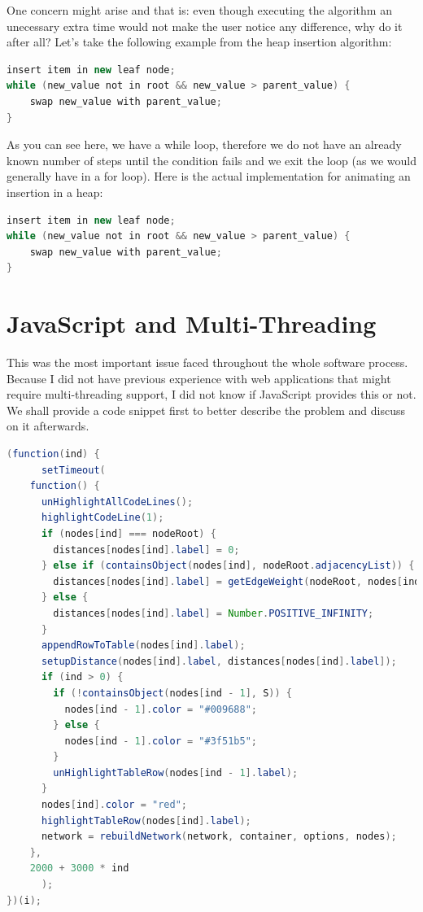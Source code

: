\documentclass{l4proj}
\begin{document}
One concern might arise and that is: even though executing the algorithm an unecessary extra time would not make the
user notice any difference, why do it after all? Let's take the following example from the heap insertion algorithm:

\begin{lstlisting}[language=Java, caption=Pseudocode for inserting a node in a heap.]
insert item in new leaf node; 
while (new_value not in root && new_value > parent_value) {
    swap new_value with parent_value;
}
\end{lstlisting}

As you can see here, we have a while loop, therefore we do not have an already known number of steps until the
condition fails and we exit the loop (as we would generally have in a for loop). Here is the actual implementation for
animating an insertion in a heap:

\begin{lstlisting}[language=Java, caption=Pseudocode for inserting a node in a heap.]
insert item in new leaf node; 
while (new_value not in root && new_value > parent_value) {
    swap new_value with parent_value;
}
\end{lstlisting}

\section{JavaScript and Multi-Threading}

This was the most important issue faced throughout the whole software process. Because I did not have previous
experience with web applications that might require multi-threading support, I did not know if JavaScript provides this
or not. We shall provide a code snippet first to better describe the problem and discuss on it afterwards.

\begin{lstlisting}[language=Java, caption=Animation function used in Dijkstra's SP algorithm.]
(function(ind) {
      setTimeout(
	function() {
	  unHighlightAllCodeLines();
	  highlightCodeLine(1);
	  if (nodes[ind] === nodeRoot) {
	    distances[nodes[ind].label] = 0;
	  } else if (containsObject(nodes[ind], nodeRoot.adjacencyList)) {
	    distances[nodes[ind].label] = getEdgeWeight(nodeRoot, nodes[ind]);
	  } else {
	    distances[nodes[ind].label] = Number.POSITIVE_INFINITY;
	  }
	  appendRowToTable(nodes[ind].label);
	  setupDistance(nodes[ind].label, distances[nodes[ind].label]);
	  if (ind > 0) {
	    if (!containsObject(nodes[ind - 1], S)) {
	      nodes[ind - 1].color = "#009688";
	    } else {
	      nodes[ind - 1].color = "#3f51b5";
	    }
	    unHighlightTableRow(nodes[ind - 1].label);
	  }
	  nodes[ind].color = "red";
	  highlightTableRow(nodes[ind].label);
	  network = rebuildNetwork(network, container, options, nodes);
	},
	2000 + 3000 * ind
      );
})(i);
\end{lstlisting}
\end{document}
